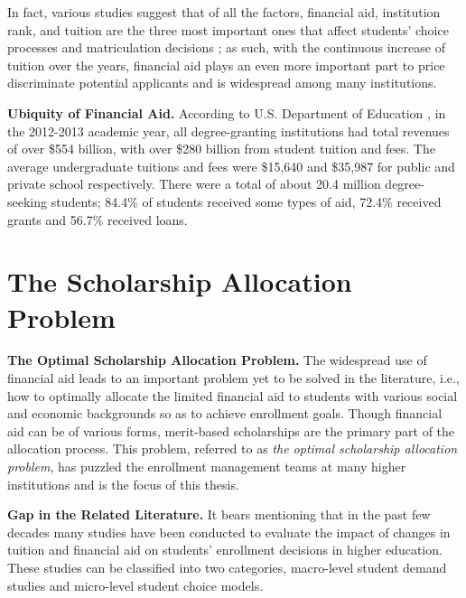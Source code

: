 \documentclass[12pt,english]{report}
\begin{document}
In fact, various studies suggest that of all the factors, financial aid, institution rank, and tuition are the three most important ones that affect students' choice processes and matriculation decisions \citep{Fulleri2014}; as such, with the continuous increase of tuition over the years, financial aid plays an even more important part to price discriminate potential applicants and is widespread among many institutions.  

\noindent \textbf{Ubiquity of Financial Aid.} According to U.S. Department of  Education \citep{DOE2014}, in the 2012-2013 academic year, all degree-granting institutions had total revenues of over \$554 billion, with over \$280 billion from student tuition and fees. The average undergraduate tuitions and fees were \$15,640 and \$35,987 for public and private school respectively. There were a total of about 20.4 million degree-seeking students;  84.4\% of students received some types of aid, 72.4\% received grants and 56.7\% received loans.

\section{The Scholarship Allocation Problem} 
\noindent \textbf{The Optimal Scholarship Allocation Problem.} The widespread use of financial aid leads to an important problem yet to be solved in the literature, i.e., how to optimally allocate the limited financial aid to students with various social and economic backgrounds so as to achieve enrollment goals. Though financial aid can be of various forms, merit-based scholarships are the primary part of the allocation process. This problem, referred to as \textit{the optimal scholarship allocation problem}, has puzzled the enrollment management teams at many higher institutions and is the focus of this thesis.


\vspace{0.15in}
\noindent \textbf{Gap in the Related Literature.} 
It bears mentioning that in the past few decades many studies have been conducted to evaluate the impact of changes in tuition and financial aid on students' enrollment decisions in higher education. These studies can be classified into two categories, macro-level student demand studies and micro-level student choice models. 
\end{document}
